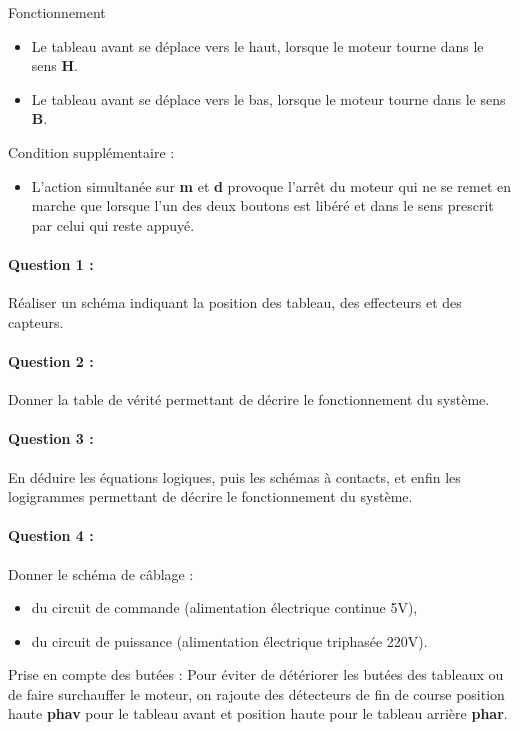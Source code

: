 Fonctionnement
\begin{itemize}
 \item Le tableau avant se déplace vers le haut, lorsque le moteur tourne dans le sens \textbf{H}.
 \item Le tableau avant se déplace vers le bas, lorsque le moteur tourne dans le sens \textbf{B}.
\end{itemize} 

Condition supplémentaire :
\begin{itemize}
 \item L'action simultanée sur \textbf{m} et \textbf{d} provoque l'arrêt du moteur qui ne se remet en marche que lorsque l'un des deux boutons est libéré et dans le sens prescrit par celui qui reste appuyé.
\end{itemize} 

\paragraph{Question 1 :} Réaliser un schéma indiquant la position des tableau, des effecteurs et des capteurs.

\paragraph{Question 2 :} Donner la table de vérité permettant de décrire le fonctionnement du système.

\paragraph{Question 3 :} En déduire les équations logiques, puis les schémas à contacts, et enfin les logigrammes permettant de décrire le fonctionnement du système.

\paragraph{Question 4 :} Donner le schéma de câblage :
\begin{itemize}
 \item du circuit de commande (alimentation électrique continue 5V),
 \item du circuit de puissance (alimentation électrique triphasée 220V).
\end{itemize}

Prise en compte des butées :
Pour éviter de détériorer les butées des tableaux ou de faire surchauffer le moteur, on rajoute des détecteurs 
de fin de course position haute \textbf{phav} pour le tableau avant et position haute pour le tableau arrière \textbf{phar}.

